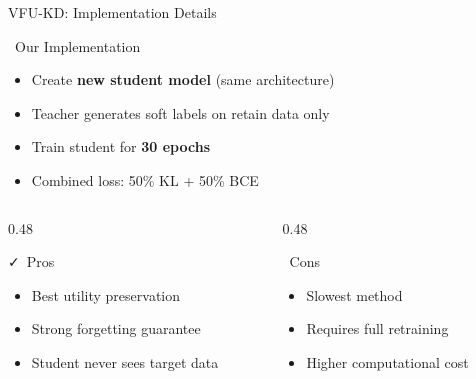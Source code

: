 \documentclass[aspectratio=169, 11pt]{beamer}
\begin{document}
\begin{frame}{VFU-KD: Implementation Details}
    \begin{block}{\faCode\ Our Implementation}
        \begin{itemize}
            \item Create \textbf{new student model} (same architecture)
            \item Teacher generates soft labels on retain data only
            \item Train student for \textbf{30 epochs}
            \item Combined loss: 50\% KL + 50\% BCE
        \end{itemize}
    \end{block}
    
    \vspace{0.5em}
    \begin{columns}[T]
        \begin{column}{0.48\textwidth}
            \begin{exampleblock}{\faCheck\ Pros}
                \begin{itemize}
                    \item Best utility preservation
                    \item Strong forgetting guarantee
                    \item Student never sees target data
                \end{itemize}
            \end{exampleblock}
        \end{column}
        \begin{column}{0.48\textwidth}
            \begin{alertblock}{\faTimes\ Cons}
                \begin{itemize}
                    \item Slowest method
                    \item Requires full retraining
                    \item Higher computational cost
                \end{itemize}
            \end{alertblock}
        \end{column}
    \end{columns}
\end{frame}
\end{document}
